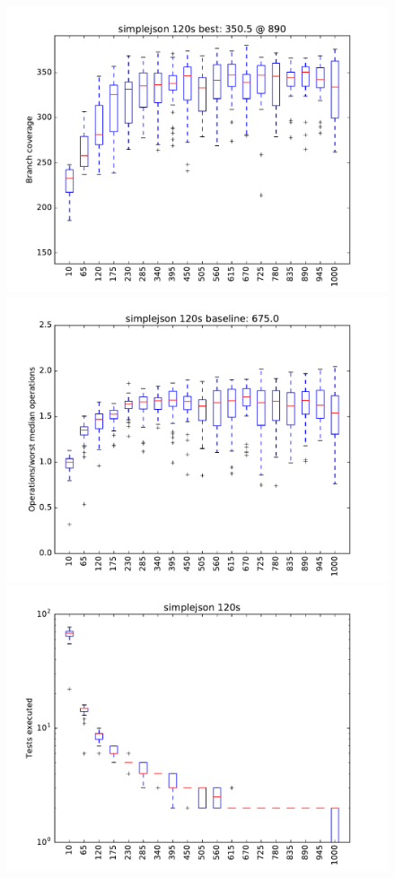 \begin{figure}
\includegraphics[width=\columnwidth]{graphs/simplejsonrand120}
\includegraphics[width=\columnwidth]{graphs/opssimplejsonrand120}
\includegraphics[width=\columnwidth]{graphs/execsimplejsonrand120}
\end{figure}


